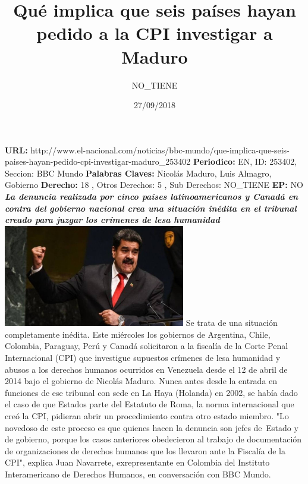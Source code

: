 \documentclass{article}%
\title{\textbf{Qué implica que seis países hayan pedido a la CPI investigar a Maduro}}%
\author{NO\_TIENE}%
\date{27/09/2018}%
\begin{document}
%
\normalsize%
\maketitle%
\textbf{URL: }%
http://www.el{-}nacional.com/noticias/bbc{-}mundo/que{-}implica{-}que{-}seis{-}paises{-}hayan{-}pedido{-}cpi{-}investigar{-}maduro\_253402\newline%
%
\textbf{Periodico: }%
EN, %
ID: %
253402, %
Seccion: %
BBC Mundo\newline%
%
\textbf{Palabras Claves: }%
Nicolás Maduro, Luis Almagro, Gobierno\newline%
%
\textbf{Derecho: }%
18%
, Otros Derechos: %
5%
, Sub Derechos: %
NO\_TIENE%
\newline%
%
\textbf{EP: }%
NO\newline%
\newline%
%
\textbf{\textit{La denuncia realizada por cinco países latinoamericanos y Canadá en contra del gobierno nacional crea una situación inédita en el tribunal creado para juzgar los crímenes de lesa humanidad}}%
\newline%
\newline%
%
\includegraphics[width=300px]{224.jpg}%
\newline%
%
Se trata de una situación completamente inédita.%
\newline%
%
Este miércoles los gobiernos de Argentina, Chile, Colombia, Paraguay, Perú y Canadá solicitaron a la fiscalía de la Corte Penal Internacional (CPI) que investigue supuestos crímenes de lesa humanidad y abusos a los derechos humanos ocurridos en Venezuela desde el 12 de abril de 2014 bajo el gobierno de Nicolás Maduro.%
\newline%
%
Nunca antes desde la entrada en funciones de ese tribunal con sede en La Haya (Holanda) en 2002, se había dado el caso de que Estados parte del Estatuto de Roma, la norma internacional que creó la CPI, pidieran abrir un procedimiento contra otro estado miembro.%
\newline%
%
"Lo novedoso de este proceso es que quienes hacen la denuncia son jefes de~Estado y de gobierno, porque los casos anteriores obedecieron al trabajo de documentación de organizaciones de derechos humanos que los llevaron ante la Fiscalía de la CPI", explica Juan Navarrete, exrepresentante en Colombia del Instituto Interamericano de Derechos Humanos, en conversación con BBC Mundo.%
\end{document}
